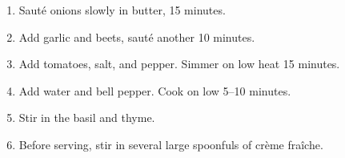 
\begin{ingredients}
\end{ingredients}


\begin{recipe}
  \begin{enumerate}

  \item Saut\'e onions slowly in butter, 15 minutes.

  \item Add garlic and beets, saut\'e another 10 minutes.

  \item Add tomatoes, salt, and pepper.  Simmer on low heat 15 minutes.

  \item Add water and bell pepper.  Cook on low 5--10 minutes.

  \item Stir in the basil and thyme.

  \item Before serving, stir in several large spoonfuls of cr\`eme fra\^iche.

  \end{enumerate}
\end{recipe}
